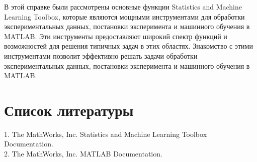 \documentclass[a4paper, 12pt]{article}%
\begin{document}
\begin{titlepage}
	В этой справке были рассмотрены основные функции Statistics and Machine Learning Toolbox, которые являются мощными инструментами для обработки экспериментальных данных, постановки эксперимента и машинного обучения в MATLAB. Эти инструменты предоставляют широкий спектр функций и возможностей для решения типичных задач в этих областях. Знакомство с этими инструментами позволит эффективно решать задачи обработки экспериментальных данных, постановки эксперимента и машинного обучения в MATLAB.\\
	
	
	\section{Список литературы}
	
	1. The MathWorks, Inc. Statistics and Machine Learning Toolbox Documentation.\\
	2. The MathWorks, Inc. MATLAB Documentation.\\

		
	\end{titlepage}
	
	
\end{document}
